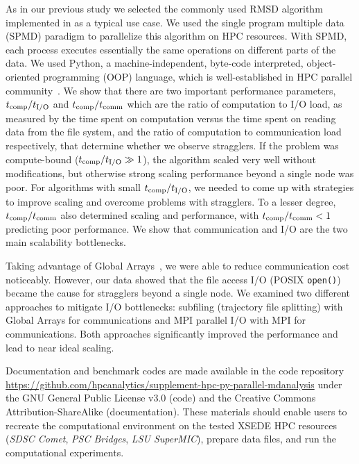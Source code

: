 As in our previous study we selected the commonly used RMSD algorithm implemented in  as a typical use case.
We used the single program multiple data (SPMD) paradigm to parallelize this algorithm on HPC resources.
With SPMD, each process executes essentially the same operations on different parts of the data. 
We used Python, a machine-independent, byte-code interpreted, object-oriented programming (OOP) language, which is well-established in HPC parallel community~\cite{GAiN}. 
We show that there are two important performance parameters, ${t}_{\text{comp}}/{t}_{\text{I/O}}$ and ${t}_{\text{comp}}/t_{\text{comm}}$ which are the ratio of computation to I/O load, as measured by the time spent on computation versus the time spent on reading data from the file system, and the ratio of computation to communication load respectively, that determine whether we observe stragglers.
If the problem was compute-bound (${t}_{\text{comp}}/{t}_{\text{I/O}} \gg 1$), the algorithm scaled very well without modifications, but otherwise strong scaling performance beyond a single node was poor.  
For algorithms with small ${t}_{\text{comp}}/{t}_{\text{I/O}}$, we needed to come up with strategies to improve scaling and overcome problems with stragglers.
To a lesser degree, ${t}_{\text{comp}}/t_{\text{comm}}$ also determined scaling and performance, with ${t}_{\text{comp}}/t_{\text{comm}} < 1$ predicting poor performance.
We show that communication and I/O are the two main scalability bottlenecks.

Taking advantage of Global Arrays~\cite{GA, GAiN}, we were able to reduce communication cost noticeably.
However, our data showed that the file access I/O (POSIX \texttt{open()}) became the cause for stragglers beyond a single node.
We examined two different approaches to mitigate I/O bottlenecks: subfiling (trajectory file splitting) with Global Arrays for communications and MPI parallel I/O with MPI for communications.
Both approaches significantly improved the performance and lead to near ideal scaling.

Documentation and benchmark codes are made available in the code repository \url{https://github.com/hpcanalytics/supplement-hpc-py-parallel-mdanalysis} under the GNU General Public License v3.0 (code) and the Creative Commons Attribution-ShareAlike (documentation). 
These materials should enable users to recreate the computational environment on the tested XSEDE HPC resources (\emph{SDSC Comet}, \emph{PSC Bridges}, \emph{LSU SuperMIC}), prepare data files, and run the computational experiments.
